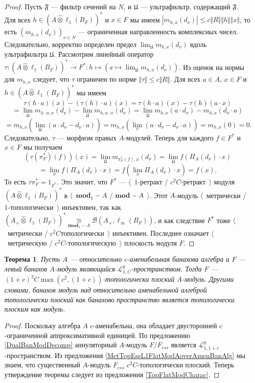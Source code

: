 \documentclass[12pt]{article}
\newtheorem{theorem}{Теорема}[section]
\newcommand{\projtens}{\mathbin{\widehat{\otimes}}}
\newcommand{\isom}[1]{\mathop{\mathbin{\cong}}\limits_{#1}}
\begin{document}
\begin{proof}
Пусть $\mathfrak{F}$ --- фильтр сечений на $N$, и $\mathfrak{U}$ --- ультрафильтр, содержащий $\mathfrak{F}$. Для всех $h\in (A\projtens\ell_1(B_F))^*$ и $x\in F$ мы имеем $|m_{h,x}(d_\nu)|\leq c\Vert R\Vert\Vert h\Vert\Vert x\Vert$, то есть $(m_{h,x}(d_\nu))_{\nu\in N}$ --- ограниченная направленность комплексных чисел. Следовательно, корректно определен предел $\lim_{\mathfrak{U}}m_{h,x}(d_\nu)$ вдоль ультрафильтра $\mathfrak{U}$. Рассмотрим линейный оператор $\tau:(A\projtens\ell_1(B_F))^*\to F^*:h\mapsto(x\mapsto\lim_{\mathfrak{U}}m_{h,x}(d_\nu))$. Из оценок на нормы для $m_{h,x}$ следует, что $\tau$ ограничен по норме $\Vert\tau\Vert\leq c\Vert R\Vert$. Для всех $a\in A$, $x\in F$ и $h\in (A\projtens\ell_1(B_F))^*$ мы имеем
\[
\tau(h\cdot a)(x)-(\tau(h)\cdot a)(x)
=\tau(h\cdot a)(x)-\tau(h)(a\cdot x)
\]
\[
=\lim_{\mathfrak{U}}m_{h\cdot a,x}(d_\nu)-\lim_{\mathfrak{U}}m_{h,a\cdot x}(d_\nu)
=\lim_{\mathfrak{U}}m_{h,x}(a\cdot d_\nu)-m_{h,x}(d_\nu\cdot a)
\]
\[
=m_{h,x}\left(\lim_{\mathfrak{U}}(a\cdot d_\nu-d_\nu\cdot a)\right)
=m_{h,x}\left(\lim_{\nu}(a\cdot d_\nu-d_\nu\cdot a)\right)
=m_{h,x}(0)
=0.
\]
Следовательно, $\tau$ --- морфизм правых $A$-модулей. Теперь для каждого $f\in F^*$ и $x\in F$ мы получаем
\[
(\tau(\pi_F^*)(f))(x)
=\lim_{\mathfrak{U}}m_{\pi_F^*(f),x}(d_\nu)
=\lim_{\mathfrak{U}}f(\Pi_A(d_\nu)\cdot x)
\]
\[
=\lim_{\nu}f(\Pi_A(d_\nu)\cdot x)
=f\left(\lim_{\nu}\Pi_A(d_\nu)\cdot x\right)
=f(x).
\]
То есть $\tau\pi_F^*=1_{F^*}$. Это значит, что $F^*$ --- $\langle$~$1$-ретракт / $c^2 C$-ретракт~$\rangle$ модуля $(A\projtens\ell_1(B_F))^*$
 в $\langle$~$\mathbf{mod}_1-A$ / $\mathbf{mod}-A$~$\rangle$. Этот $A$-модуль $\langle$~метрически / $1$-топологически~$\rangle$ инъективен, так как $(A_+\projtens\ell_1(B_F))^*\isom{\mathbf{mod}_1-A}\mathcal{B}(A_+,\ell_\infty(B_F))$, и как следствие $F^*$ тоже $\langle$~метрически / $c^2C$топологически~$\rangle$ инъективен. Последнее означает $\langle$~метрическую / $c^2 C$-топологическую~$\rangle$ плоскость модуля $F$.
\end{proof}

\begin{theorem}\label{TopL1FlatModAoverAmenBanAlg} Пусть $A$ --- относительно $c$-аменабельная банахова алгебра и $F$ --- левый банахов $A$-модуль являющийся $\mathcal{L}_{1, C}^g$-пространством. Тогда $F$ --- $(1+c)^2C\max(c^2,(1+c))$-топологически плоский $A$-модуль. Другими словами, банахов модуль над относительно аменабельной алгеброй топологически плоский как банахово пространство является топологически плоским как модуль.
\end{theorem}
\begin{proof} Поскольку алгебра $A$ $c$-аменабельна, она обладает двусторонней $c$-ограниченной аппроксимативной единицей. По предложению \ref{DualBanModDecomp} аннуляторный $A$-модуль $F/F_{ess}$ является $\mathcal{L}_{1,1+c}^g$-пространством. Из предложения \ref{MetTopEssL1FlatModAoverAmenBanAlg} мы знаем, что существенный $A$-модуль $F_{ess}$ $c^2 C$-топологически плоский. Теперь утверждение теоремы следует из предложения \ref{TopFlatModCharac}.
\end{proof}
\end{document}
